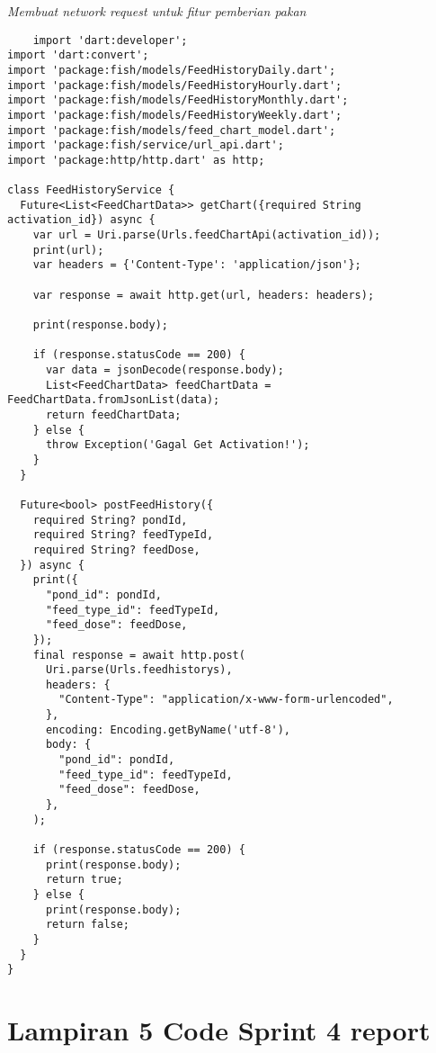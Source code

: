 	\textit{Membuat network request untuk fitur pemberian pakan}
	\begin{lstlisting}
	import 'dart:developer';
import 'dart:convert';
import 'package:fish/models/FeedHistoryDaily.dart';
import 'package:fish/models/FeedHistoryHourly.dart';
import 'package:fish/models/FeedHistoryMonthly.dart';
import 'package:fish/models/FeedHistoryWeekly.dart';
import 'package:fish/models/feed_chart_model.dart';
import 'package:fish/service/url_api.dart';
import 'package:http/http.dart' as http;

class FeedHistoryService {
  Future<List<FeedChartData>> getChart({required String activation_id}) async {
    var url = Uri.parse(Urls.feedChartApi(activation_id));
    print(url);
    var headers = {'Content-Type': 'application/json'};

    var response = await http.get(url, headers: headers);

    print(response.body);

    if (response.statusCode == 200) {
      var data = jsonDecode(response.body);
      List<FeedChartData> feedChartData = FeedChartData.fromJsonList(data);
      return feedChartData;
    } else {
      throw Exception('Gagal Get Activation!');
    }
  }

  Future<bool> postFeedHistory({
    required String? pondId,
    required String? feedTypeId,
    required String? feedDose,
  }) async {
    print({
      "pond_id": pondId,
      "feed_type_id": feedTypeId,
      "feed_dose": feedDose,
    });
    final response = await http.post(
      Uri.parse(Urls.feedhistorys),
      headers: {
        "Content-Type": "application/x-www-form-urlencoded",
      },
      encoding: Encoding.getByName('utf-8'),
      body: {
        "pond_id": pondId,
        "feed_type_id": feedTypeId,
        "feed_dose": feedDose,
      },
    );

    if (response.statusCode == 200) {
      print(response.body);
      return true;
    } else {
      print(response.body);
      return false;
    }
  }
}
	\end{lstlisting}

	\clearpage
	\section{Lampiran 5 Code Sprint 4 report}

